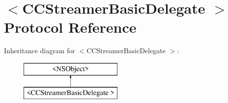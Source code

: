 \hypertarget{protocol_c_c_streamer_basic_delegate_01-p}{}\section{$<$C\+C\+Streamer\+Basic\+Delegate $>$ Protocol Reference}
\label{protocol_c_c_streamer_basic_delegate_01-p}
Inheritance diagram for $<$C\+C\+Streamer\+Basic\+Delegate $>$\+:\begin{figure}[H]
\begin{center}
\leavevmode
\includegraphics[height=2.000000cm]{protocol_c_c_streamer_basic_delegate_01-p}
\end{center}
\end{figure}
